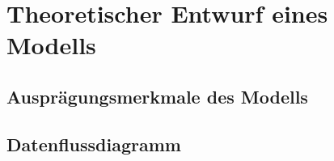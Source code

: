 \section{Theoretischer Entwurf eines Modells}
\subsection{Ausprägungsmerkmale des Modells}
\subsection{Datenflussdiagramm}